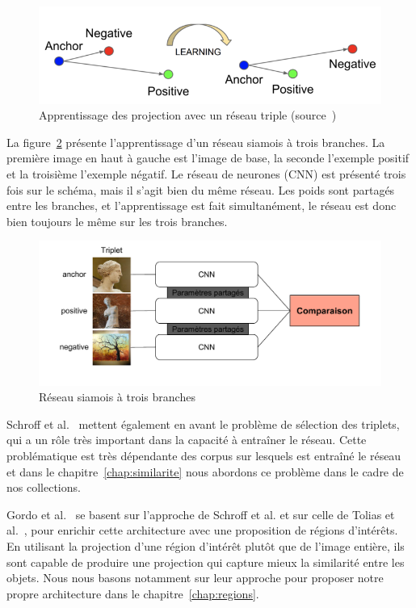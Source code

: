 \begin{figure}%
\includegraphics[width=\columnwidth]{figures/facenet.png}%
\caption{Apprentissage des projection avec un réseau triple (source~\cite{schroff2015facenet})}%
\label{fig:facenet}%
\end{figure}

La figure~\ref{fig:tripletloss} présente l'apprentissage d’un réseau siamois à trois branches.
La première image en haut à gauche est l'image de base, la seconde l'exemple positif et la troisième l'exemple négatif.
Le réseau de neurones (CNN) est présenté trois fois sur le schéma, mais il s'agit bien du même réseau. 
Les poids sont partagés entre les branches, et l'apprentissage est fait simultanément, le réseau est donc bien toujours le même sur les trois branches.

\begin{figure}[ht!]
	\centering
    \includegraphics[width=\linewidth]{figures/3branches.pdf}
    \caption{Réseau siamois à trois branches}
		\label{fig:tripletloss}
\end{figure}

Schroff et al.~\cite{schroff2015facenet} mettent également en avant le problème de sélection des triplets, qui a un rôle très important dans la capacité à entraîner le réseau. 
Cette problématique est très dépendante des corpus sur lesquels est entraîné le réseau et dans le chapitre~\ref{chap:similarite} nous abordons ce problème dans le cadre de nos collections.

Gordo et al.~\cite{gordo2016deep} se basent sur l’approche de Schroff et al. et sur celle de Tolias et al.~\cite{tolias2015particular}, pour enrichir cette architecture avec une proposition de régions d'intérêts.
En utilisant la projection d'une région d'intérêt plutôt que de l'image entière, ils sont capable de produire une projection qui capture mieux la similarité entre les objets.
Nous nous basons notamment sur leur approche pour proposer notre propre architecture dans le chapitre~\ref{chap:regions}.

